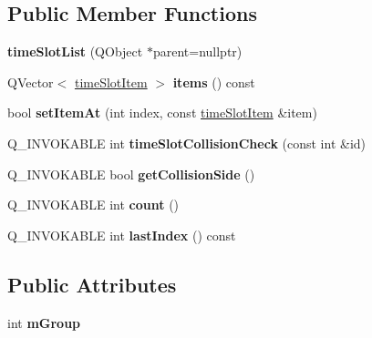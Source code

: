 \subsection*{Public Member Functions}
\begin{DoxyCompactItemize}
\item 
\mbox{\label{classtime_slot_list_a1cd9b1ac08dba361f5559e686e74e6fd}} 
{\bfseries time\+Slot\+List} (Q\+Object $\ast$parent=nullptr)
\item 
\mbox{\label{classtime_slot_list_ae4c1727831d22818a99ee50d21378b82}} 
Q\+Vector$<$ \mbox{\hyperlink{structtime_slot_item}{time\+Slot\+Item}} $>$ {\bfseries items} () const
\item 
\mbox{\label{classtime_slot_list_a31647cc65b8a4ba56516b5ae4df84dac}} 
bool {\bfseries set\+Item\+At} (int index, const \mbox{\hyperlink{structtime_slot_item}{time\+Slot\+Item}} \&item)
\item 
\mbox{\label{classtime_slot_list_a06f8f6e6f14c14c88e3bb1ded2f456c4}} 
Q\+\_\+\+I\+N\+V\+O\+K\+A\+B\+LE int {\bfseries time\+Slot\+Collision\+Check} (const int \&id)
\item 
\mbox{\label{classtime_slot_list_a33b47cc51453492e0e6fab1266c6bca7}} 
Q\+\_\+\+I\+N\+V\+O\+K\+A\+B\+LE bool {\bfseries get\+Collision\+Side} ()
\item 
\mbox{\label{classtime_slot_list_a2bfee5da3e54d9e737ba28ad8d15aca4}} 
Q\+\_\+\+I\+N\+V\+O\+K\+A\+B\+LE int {\bfseries count} ()
\item 
\mbox{\label{classtime_slot_list_aac922a60e02bcd55751cdce7319d0233}} 
Q\+\_\+\+I\+N\+V\+O\+K\+A\+B\+LE int {\bfseries last\+Index} () const
\end{DoxyCompactItemize}
\subsection*{Public Attributes}
\begin{DoxyCompactItemize}
\item 
\mbox{\label{classtime_slot_list_a55069a5cdebfd5e4dfca2ee72ebb11a3}} 
int {\bfseries m\+Group}
\end{DoxyCompactItemize}


